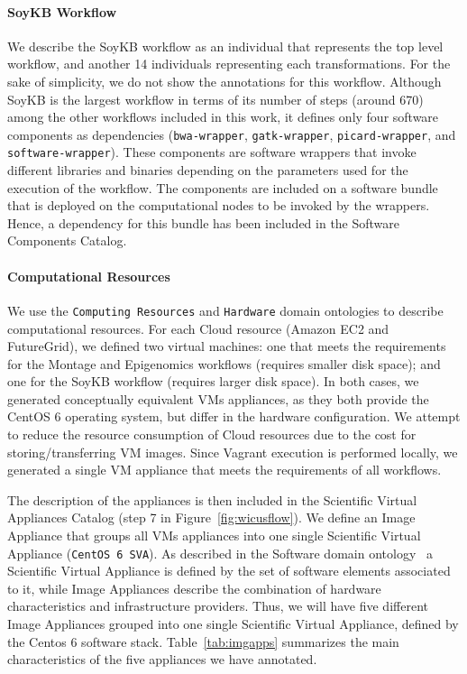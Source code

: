 \paragraph{\textbf{SoyKB Workflow}}
We describe the SoyKB workflow as an individual that represents the top level workflow,
and another 14 individuals representing each transformations. For the sake of simplicity,
we do not show the annotations for this workflow. Although SoyKB is the largest workflow 
in terms of its number of steps (around 670) among the other workflows included in this 
work, it defines only four software components as dependencies (\texttt{bwa-wrapper}, 
\texttt{gatk-wrapper}, \texttt{picard-wrapper}, and \texttt{software-wrapper}). These 
components  are software wrappers that invoke different libraries and binaries depending 
on the parameters used for the execution of the workflow. The components are included 
on a software bundle that is deployed on the computational nodes to be invoked by the 
wrappers. Hence, a dependency for this bundle has been included in the Software 
Components Catalog.

\paragraph{\textbf{Computational Resources}}
We use the \texttt{Computing Resources} and \texttt{Hardware} domain ontologies 
to describe computational resources. For each Cloud resource (Amazon EC2 and 
FutureGrid), we defined two virtual machines: one that meets the requirements for the 
Montage and Epigenomics workflows (requires smaller disk space); and one for the 
SoyKB workflow (requires larger disk space). In both cases, we generated conceptually 
equivalent VMs appliances, as they both provide the CentOS 6 operating system, but differ
in the hardware configuration. We attempt to reduce the resource consumption of
Cloud resources due to the cost for storing/transferring VM images. Since Vagrant
execution is performed locally, we generated a single VM appliance that meets the 
requirements of all workflows. 

The description of the appliances is then included in the Scientific Virtual Appliances 
Catalog (step 7 in Figure~\ref{fig:wicusflow}). We define  an Image Appliance that groups 
all VMs appliances into one single Scientific Virtual Appliance (\texttt{CentOS 6 SVA}). 
As described in the Software domain ontology~\cite{wicus} a Scientific Virtual Appliance
is defined by the set of software elements associated to it, while Image Appliances 
describe the combination of hardware characteristics and infrastructure providers. Thus, 
we will have five different Image Appliances grouped into one single Scientific Virtual Appliance,
defined by the Centos 6 software stack.
Table~\ref{tab:imgapps} summarizes the main characteristics of the five appliances 
we have annotated.

